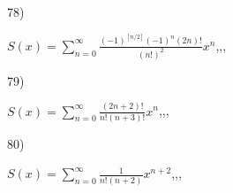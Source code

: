 \documentclass[11pt, ukrainian]{article}
\begin{document}
\par
\vspace{0.9cm}
78) \space 
{%
{$S(x)=\sum\limits_{n=0}^{\infty}{\frac{{(-1)^{[n/2]}}{(-1)^n}(2n)!}{(n!)^2}}{x^{n}}$},,, \par \smallskip  
}
\par
\vspace{0.9cm}
79) \space 
{%
{$S(x)=\sum\limits_{n=0}^{\infty}{\frac{(2n+2)!}{n!(n+3)!}}{x^{n}}$},,, \par \smallskip  
}
\par
\vspace{0.9cm}
80) \space 
{%
{$S(x)=\sum\limits_{n=0}^{\infty}{\frac{1}{n!(n+2)}}{x^{{n+2}}}$},,, \par \smallskip  
}
\par
\end{document}
